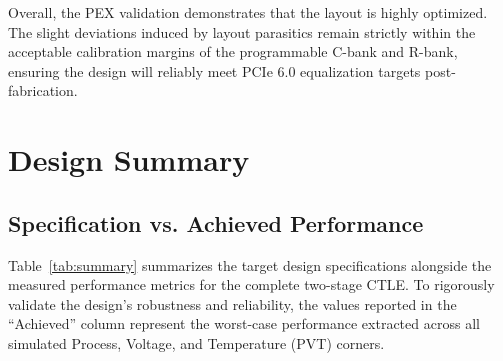 Overall, the PEX validation demonstrates that the layout is highly optimized. The slight deviations induced by layout parasitics remain strictly within the acceptable calibration margins of the programmable C-bank and R-bank, ensuring the design will reliably meet PCIe 6.0 equalization targets post-fabrication.



\newpage
\section*{Design Summary}
\label{sec:summary}

\subsection*{Specification vs. Achieved Performance}

Table~\ref{tab:summary} summarizes the target design specifications alongside the measured performance metrics for the complete two-stage CTLE. To rigorously validate the design's robustness and reliability, the values reported in the ``Achieved'' column represent the worst-case performance extracted across all simulated Process, Voltage, and Temperature (PVT) corners. 

